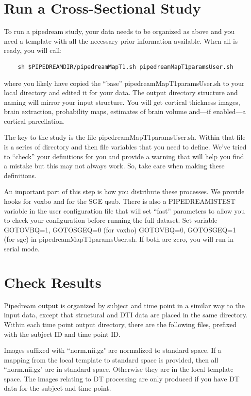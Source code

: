 \documentclass{InsightArticle}
\begin{document}
\section{Run a Cross-Sectional Study}
To run a pipedream study, your data needs to be organized as above and you need a template 
with all the necessary prior information available.  When all is ready, you will call:
\begin{verbatim}
    sh $PIPEDREAMDIR/pipedreamMapT1.sh pipedreamMapT1paramsUser.sh 
\end{verbatim}
where you likely have copied the ``base'' pipedreamMapT1paramsUser.sh
to your local directory and edited it for your data.  The output
directory structure and naming will mirror your input structure.  You
will get cortical thickness images, brain extraction, probability
maps, estimates of brain volume and---if enabled---a cortical
parcellation.

The key to the study is the file pipedreamMapT1paramsUser.sh.  
Within that file is a series of directory and then file variables that you need to define.  
We've tried to ``check'' your definitions for you and provide a warning that will help you 
find a mistake but this may not always work.  So, take care when making these definitions.

An important part of this step is how you distribute these processes.
We provide hooks for voxbo and for the SGE qsub.  There is also a
PIPEDREAMISTEST variable in the user configuration file that will set
``fast'' parameters to allow you to check your configuration before
running the full dataset.  Set variable GOTOVBQ=1, GOTOSGEQ=0 (for
voxbo) GOTOVBQ=0, GOTOSGEQ=1 (for sge) in pipedreamMapT1paramsUser.sh.  
If both are zero, you will run in serial mode. 

\section{Check Results}

Pipedream output is organized by subject and time point in a similar way to the input data, except that structural and DTI data are placed in the same directory. Within each time point output directory, there are the following files, prefixed with the subject ID and time point ID.

Images suffixed with ``norm.nii.gz" are normalized to standard space. If a mapping from the local template to standard space is provided, then all ``norm.nii.gz" are in standard space. Otherwise they are in the local template space. The images relating to DT processing are only produced if you have DT data for the subject and time point.
\end{document}
